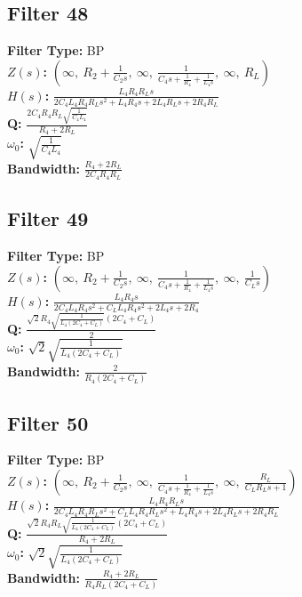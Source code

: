 \documentclass{article}
\begin{document}
\subsection*{Filter 48}
\textbf{Filter Type:} BP \\ 
\textbf{$Z(s)$:} $\left( \infty, \  R_{2} + \frac{1}{C_{2} s}, \  \infty, \  \frac{1}{C_{4} s + \frac{1}{R_{4}} + \frac{1}{L_{4} s}}, \  \infty, \  R_{L}\right)$ \\ 
\textbf{$H(s)$:} $\frac{L_{4} R_{4} R_{L} s}{2 C_{4} L_{4} R_{4} R_{L} s^{2} + L_{4} R_{4} s + 2 L_{4} R_{L} s + 2 R_{4} R_{L}}$ \\ 
\textbf{Q:} $\frac{2 C_{4} R_{4} R_{L} \sqrt{\frac{1}{C_{4} L_{4}}}}{R_{4} + 2 R_{L}}$ \\ 
\textbf{$\omega_0$:} $\sqrt{\frac{1}{C_{4} L_{4}}}$ \\ 
\textbf{Bandwidth:} $\frac{R_{4} + 2 R_{L}}{2 C_{4} R_{4} R_{L}}$ \\ 
\subsection*{Filter 49}
\textbf{Filter Type:} BP \\ 
\textbf{$Z(s)$:} $\left( \infty, \  R_{2} + \frac{1}{C_{2} s}, \  \infty, \  \frac{1}{C_{4} s + \frac{1}{R_{4}} + \frac{1}{L_{4} s}}, \  \infty, \  \frac{1}{C_{L} s}\right)$ \\ 
\textbf{$H(s)$:} $\frac{L_{4} R_{4} s}{2 C_{4} L_{4} R_{4} s^{2} + C_{L} L_{4} R_{4} s^{2} + 2 L_{4} s + 2 R_{4}}$ \\ 
\textbf{Q:} $\frac{\sqrt{2} R_{4} \sqrt{\frac{1}{L_{4} \left(2 C_{4} + C_{L}\right)}} \left(2 C_{4} + C_{L}\right)}{2}$ \\ 
\textbf{$\omega_0$:} $\sqrt{2} \sqrt{\frac{1}{L_{4} \left(2 C_{4} + C_{L}\right)}}$ \\ 
\textbf{Bandwidth:} $\frac{2}{R_{4} \left(2 C_{4} + C_{L}\right)}$ \\ 
\subsection*{Filter 50}
\textbf{Filter Type:} BP \\ 
\textbf{$Z(s)$:} $\left( \infty, \  R_{2} + \frac{1}{C_{2} s}, \  \infty, \  \frac{1}{C_{4} s + \frac{1}{R_{4}} + \frac{1}{L_{4} s}}, \  \infty, \  \frac{R_{L}}{C_{L} R_{L} s + 1}\right)$ \\ 
\textbf{$H(s)$:} $\frac{L_{4} R_{4} R_{L} s}{2 C_{4} L_{4} R_{4} R_{L} s^{2} + C_{L} L_{4} R_{4} R_{L} s^{2} + L_{4} R_{4} s + 2 L_{4} R_{L} s + 2 R_{4} R_{L}}$ \\ 
\textbf{Q:} $\frac{\sqrt{2} R_{4} R_{L} \sqrt{\frac{1}{L_{4} \left(2 C_{4} + C_{L}\right)}} \left(2 C_{4} + C_{L}\right)}{R_{4} + 2 R_{L}}$ \\ 
\textbf{$\omega_0$:} $\sqrt{2} \sqrt{\frac{1}{L_{4} \left(2 C_{4} + C_{L}\right)}}$ \\ 
\textbf{Bandwidth:} $\frac{R_{4} + 2 R_{L}}{R_{4} R_{L} \left(2 C_{4} + C_{L}\right)}$ \\ 
\end{document}
